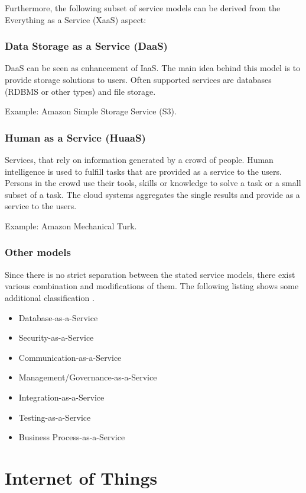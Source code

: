 

Furthermore, the following subset of service models can be derived from the Everything as a Service (XaaS) aspect:

\subsubsection{Data Storage as a Service (DaaS)}
DaaS can be seen as enhancement of IaaS. The main idea behind this model is to provide storage solutions to users. Often supported services are databases (RDBMS or other types) and file storage.
		
Example: Amazon Simple Storage Service (S3)\cite{issues}.

\subsubsection{Human as a Service (HuaaS)}
Services, that rely on information generated by a crowd of people. Human intelligence is used to fulfill tasks that are provided as a service to the users. Persons in the crowd use their tools, skills or knowledge to solve a task or a small subset of a task. The cloud systems aggregates the single results and provide as a service to the users.
	
Example: Amazon Mechanical Turk\cite{huaas}.

\subsubsection{Other models}
Since there is no strict separation between the stated service models, there exist various combination and modifications of them. The following listing shows some additional classification \cite{cloud_characteristics}.
\begin{itemize}
	\item Database-as-a-Service
	\item Security-as-a-Service
	\item Communication-as-a-Service
	\item Management/Governance-as-a-Service
	\item Integration-as-a-Service
	\item Testing-as-a-Service
	\item Business Process-as-a-Service
\end{itemize}

\section{Internet of Things}

